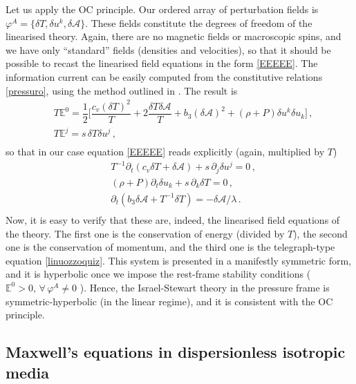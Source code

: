 \documentclass[a4paper, amsfonts, amssymb, amsmath, reprint, showkeys, nofootinbib, twoside, onecolumn,notitlepage]{revtex4-1}
\begin{document}
Let us apply the OC principle. Our ordered array of perturbation fields is $\varphi^A=\{\delta T, \delta u^k, \delta \mathcal{A} \}$. These fields constitute the degrees of freedom of the linearised theory. Again, there are no magnetic fields or macroscopic spins, and we have only  ``standard'' fields (densities and velocities), so that it should be possible to recast the linearised field equations in the form \eqref{EEEEE}. The information current can be easily computed from the constitutive relations \eqref{pressuro}, using the method outlined in \cite{GavassinoGibbs2021}. The result is
\begin{equation}\label{infurbo}
\begin{split}
& T\mathbb{E}^0 = \dfrac{1}{2} \bigg[ \dfrac{c_v (\delta T)^2}{T} + 2 \dfrac{\delta T \delta \mathcal{A}}{T} +  b_3 (\delta \mathcal{A})^2  + (\rho+P)\delta u^k \delta u_k \bigg] \, , \\
& T\mathbb{E}^j = s \, \delta T \delta u^j \, ,\\
\end{split}
\end{equation}
so that in our case equation \eqref{EEEEE} reads explicitly (again, multiplied by $T$)
\begin{equation}
\begin{split}
& T^{-1} \partial_t (c_v \delta T + \delta \mathcal{A}) + s \, \partial_j \delta u^j =0 \, , \\
& (\rho+P)\partial_t \delta u_k +s \, \partial_k \delta T =0  \, ,\\
& \partial_t ( b_3 \delta \mathcal{A} +T^{-1}\delta T ) = -\delta \mathcal{A}/\lambda  \, . \\
\end{split}
\end{equation}
Now, it is easy to verify that these are, indeed, the linearised field equations of the theory. The first one is the conservation of energy (divided by $T$), the second one is the conservation of momentum, and the third one is the telegraph-type equation \eqref{linuozzoquiz}. This system is presented in a manifestly symmetric form, and it is hyperbolic once we impose the rest-frame stability conditions ($\mathbb{E}^0 >0, \, \forall \, \varphi^A \neq 0$ \cite{GavassinoGibbs2021}). Hence, the Israel-Stewart theory in the pressure frame is symmetric-hyperbolic (in the linear regime), and it is consistent with the OC principle.


\subsection{Maxwell's equations in dispersionless isotropic media}
\end{document}
